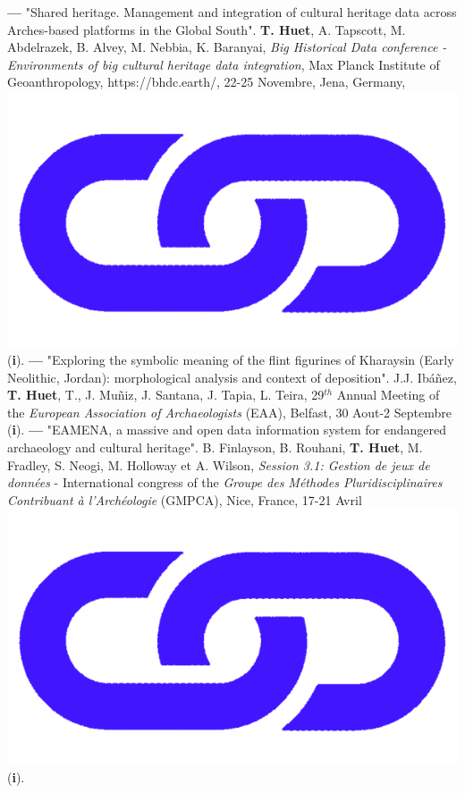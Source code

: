 \documentclass{article}
\begin{document}
\textbf{--- }"Shared heritage. Management and integration of cultural heritage data across Arches-based platforms in the Global South". \textbf{T. Huet}, A. Tapscott, M. Abdelrazek, B. Alvey, M. Nebbia, K. Baranyai, \textit{Big Historical Data conference - Environments of big cultural heritage data integration}, Max Planck Institute of Geoanthropology, https://bhdc.earth/, 22-25 Novembre, Jena, Germany,  \href{https://colab.research.google.com/github/achp-project/cultural-heritage/blob/main/presentation/bhdc/rm_compar.ipynb}{\includegraphics[scale=0.015]{link_darkblue.png}} (\textbf{i}).
\smallbreak
\textbf{--- }"Exploring the symbolic meaning of the flint figurines of Kharaysin (Early Neolithic, Jordan): morphological analysis and context of deposition". J.J. Ibáñez, \textbf{T. Huet}, T., J. Muñiz, J. Santana, J. Tapia, L. Teira, 29${}^{th}$ Annual Meeting of the \textit{European Association of Archaeologists} (EAA), Belfast, 30 Aout-2 Septembre (\textbf{i}).
\smallbreak
\textbf{--- }"EAMENA, a massive and open data information system for endangered archaeology and cultural heritage". B. Finlayson, B. Rouhani, \textbf{T. Huet}, M. Fradley, S. Neogi, M. Holloway et A. Wilson, \textit{Session 3.1: Gestion de jeux de données} - International congress of the \textit{Groupe des Méthodes Pluridisciplinaires Contribuant à l'Archéologie} (GMPCA), Nice, France, 17-21 Avril \href{https://eamena-project.github.io/eamena-arches-dev/talks/2023-gmpca/pres/#/title-slide}{\includegraphics[scale=0.015]{link_darkblue.png}} (\textbf{i}).
\end{document}
